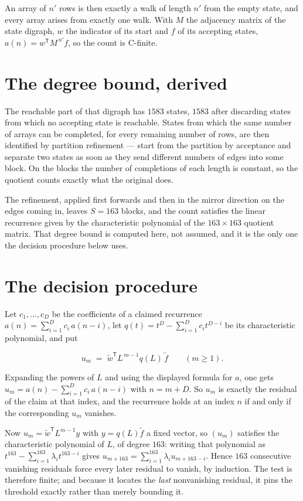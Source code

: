 \documentclass[11pt]{article}
\theoremstyle{definition}
\begin{document}
An array of $n'$ rows is then exactly a walk of length $n'$ from the empty state, and every array arises from exactly one walk. With $M$ the adjacency matrix of the state digraph, $w$ the indicator of its start and $f$ of its accepting states, $a(n) = w^{\mathsf T}M^{\,n'}f$, so the count is C-finite.

\section{The degree bound, derived}

The reachable part of that digraph has $1583$ states, $1583$ after discarding states from which no accepting state is reachable. States from which the same number of arrays can be completed, for every remaining number of rows, are then identified by partition refinement --- start from the partition by acceptance and separate two states as soon as they send different numbers of edges into some block. On the blocks the number of completions of each length is constant, so the quotient counts exactly what the original does.

The refinement, applied first forwards and then in the mirror direction on the edges coming in, leaves $S = 163$ blocks, and the count satisfies the linear recurrence given by the characteristic polynomial of the $163 \times 163$ quotient matrix. That degree bound is computed here, not assumed, and it is the only one the decision procedure below uses.

\section{The decision procedure}

Let $c_1,\dots,c_D$ be the coefficients of a claimed recurrence $a(n) = \sum_{i=1}^{D} c_i\,a(n-i)$, let $q(t) = t^{D} - \sum_{i=1}^{D} c_i t^{D-i}$ be its characteristic polynomial, and put

\[u_m \;=\; \tilde w^{\mathsf T} L^{\,m-1} q(L)\,\tilde f \qquad (m \ge 1).\]

Expanding the powers of $L$ and using the displayed formula for $a$, one gets $u_m = a(n) - \sum_{i=1}^{D} c_i\,a(n-i)$ with $n = m + D$. So $u_m$ is exactly the residual of the claim at that index, and the recurrence holds at an index $n$ if and only if the corresponding $u_m$ vanishes.

Now $u_m = \tilde w^{\mathsf T} L^{m-1} y$ with $y = q(L)\tilde f$ a fixed vector, so $(u_m)$ satisfies the characteristic polynomial of $L$, of degree $163$: writing that polynomial as $t^{163} - \sum_{i=1}^{163} \lambda_i t^{163-i}$ gives $u_{m+163} = \sum_{i=1}^{163} \lambda_i u_{m+163-i}$. Hence $163$ consecutive vanishing residuals force every later residual to vanish, by induction. The test is therefore finite; and because it locates the {\itshape last} nonvanishing residual, it pins the threshold exactly rather than merely bounding it.
\end{document}
